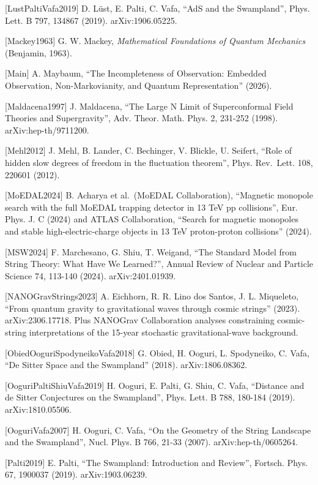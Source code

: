 \documentclass[
]{article}
\begin{document}
{[}LustPaltiVafa2019{]} D. Lüst, E. Palti, C. Vafa, ``AdS and the
Swampland'', Phys. Lett. B 797, 134867 (2019). arXiv:1906.05225.

{[}Mackey1963{]} G. W. Mackey, \emph{Mathematical Foundations of Quantum
Mechanics} (Benjamin, 1963).

{[}Main{]} A. Maybaum, ``The Incompleteness of Observation: Embedded
Observation, Non-Markovianity, and Quantum Representation'' (2026).

{[}Maldacena1997{]} J. Maldacena, ``The Large N Limit of Superconformal
Field Theories and Supergravity'', Adv. Theor. Math. Phys. 2, 231-252
(1998). arXiv:hep-th/9711200.

{[}Mehl2012{]} J. Mehl, B. Lander, C. Bechinger, V. Blickle, U. Seifert,
``Role of hidden slow degrees of freedom in the fluctuation theorem'',
Phys. Rev.~Lett. 108, 220601 (2012).

{[}MoEDAL2024{]} B. Acharya et al.~(MoEDAL Collaboration), ``Magnetic
monopole search with the full MoEDAL trapping detector in 13 TeV pp
collisions'', Eur. Phys. J. C (2024) and ATLAS Collaboration, ``Search
for magnetic monopoles and stable high-electric-charge objects in 13 TeV
proton-proton collisions'' (2024).

{[}MSW2024{]} F. Marchesano, G. Shiu, T. Weigand, ``The Standard Model
from String Theory: What Have We Learned?'', Annual Review of Nuclear
and Particle Science 74, 113-140 (2024). arXiv:2401.01939.

{[}NANOGravStrings2023{]} A. Eichhorn, R. R. Lino dos Santos, J. L.
Miqueleto, ``From quantum gravity to gravitational waves through cosmic
strings'' (2023). arXiv:2306.17718. Plus NANOGrav Collaboration analyses
constraining cosmic-string interpretations of the 15-year stochastic
gravitational-wave background.

{[}ObiedOoguriSpodyneikoVafa2018{]} G. Obied, H. Ooguri, L. Spodyneiko,
C. Vafa, ``De Sitter Space and the Swampland'' (2018). arXiv:1806.08362.

{[}OoguriPaltiShiuVafa2019{]} H. Ooguri, E. Palti, G. Shiu, C. Vafa,
``Distance and de Sitter Conjectures on the Swampland'', Phys. Lett. B
788, 180-184 (2019). arXiv:1810.05506.

{[}OoguriVafa2007{]} H. Ooguri, C. Vafa, ``On the Geometry of the String
Landscape and the Swampland'', Nucl. Phys. B 766, 21-33 (2007).
arXiv:hep-th/0605264.

{[}Palti2019{]} E. Palti, ``The Swampland: Introduction and Review'',
Fortsch. Phys. 67, 1900037 (2019). arXiv:1903.06239.
\end{document}
